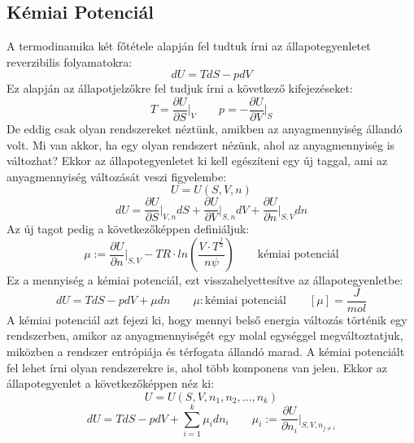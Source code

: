 \documentclass[a4paper,12pt]{article}
\begin{document}
\subsection{Kémiai Potenciál}
A termodinamika két főtétele alapján fel tudtuk írni az állapotegyenletet reverzibilis folyamatokra:
\begin{equation}
    dU = T dS - p dV
\end{equation}
Ez alapján az állapotjelzőkre fel tudjuk írni a következő kifejezéseket:
\begin{equation}
    T = \frac{\partial U}{\partial S}\bigg|_V \qquad p = - \frac{\partial U}{\partial V}\bigg|_S
\end{equation}
De eddig csak olyan rendszereket néztünk, amikben az anyagmennyiség állandó volt. Mi van akkor, ha egy olyan rendszert nézünk, ahol az anyagmennyiség is változhat?
Ekkor az állapotegyenletet ki kell egészíteni egy új taggal, ami az anyagmennyiség változását veszi figyelembe:
\begin{equation}
    U = U(S, V, n)
\end{equation}
\begin{equation}
    dU = \frac{\partial U}{\partial S}\bigg|_{V,n} dS + \frac{\partial U}{\partial V}\bigg|_{S,n} dV + \frac{\partial U}{\partial n}\bigg|_{S,V} dn
\end{equation}
Az új tagot pedig a következőképpen definiáljuk:
\begin{equation}
    \mu := \frac{\partial U}{\partial n}\bigg|_{S,V} - TR \cdot ln{\left(\frac{V \cdot T^{\frac{f}{2}}}{n \psi}\right)} \qquad \text{kémiai potenciál}
\end{equation}
Ez a mennyiség a kémiai potenciál, ezt visszahelyettesítve az állapotegyenletbe:
\begin{equation}
    dU = T dS - p dV + \mu dn \qquad \mu: \text{kémiai potenciál} \qquad \left[\mu\right] = \frac{J}{mol}
\end{equation}
A kémiai potenciál azt fejezi ki, hogy mennyi belső energia változás történik egy rendszerben, amikor az anyagmennyiségét egy molal egységgel megváltoztatjuk,
miközben a rendszer entrópiája és térfogata állandó marad.
\newline
\newline
A kémiai potenciált fel lehet írni olyan rendszerekre is, ahol több komponens van jelen. Ekkor az állapotegyenlet a következőképpen néz ki:
\begin{equation}
    U = U(S, V, n_1, n_2, \dots, n_k)
\end{equation}
\begin{equation}
    dU = T dS - p dV + \sum_{i=1}^{k} \mu_i dn_i \qquad \mu_i := \frac{\partial U}{\partial n_i}\bigg|_{S,V,n_{j \neq i}}
\end{equation}
\end{document}
